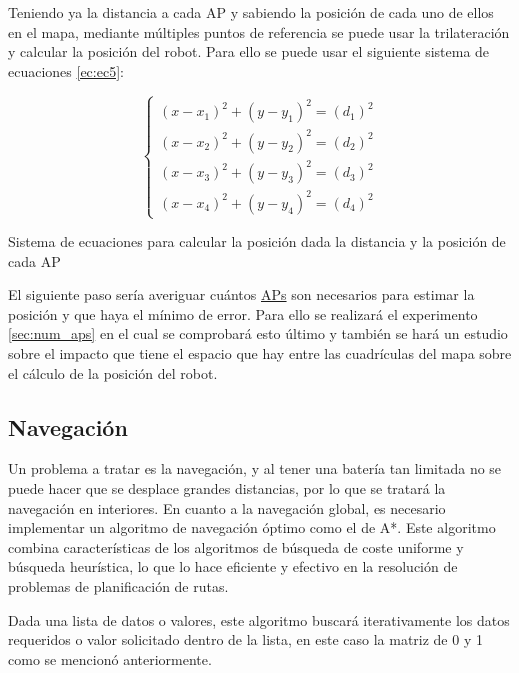 Teniendo ya la distancia a cada AP y sabiendo la posición de cada uno de ellos en el mapa, mediante múltiples puntos de referencia se puede usar la trilateración y calcular la posición del robot. Para ello se puede usar el siguiente sistema de ecuaciones \ref{ec:ec5}:




\begin{myequation}[H]
\begin{equation}
\left\{
	\begin{array}{lcc}
		(x - x_1)^2 + (y - y_1)^2 = (d_1)^2\\
		(x - x_2)^2 + (y - y_2)^2 = (d_2)^2\\
		(x - x_3)^2 + (y - y_3)^2 = (d_3)^2 \\
		(x - x_4)^2 + (y - y_4)^2 = (d_4)^2
	\end{array}
\right.
\label{ec:ec5}
\end{equation}
\caption[Sistema de ecuaciones para calcular la posición dada la distancia y la posición de cada AP]{Sistema de ecuaciones para calcular la posición dada la distancia y la posición de cada AP}
\end{myequation}


El siguiente paso sería averiguar cuántos \hyperlink{APs}{APs} son necesarios para estimar la posición y que haya el mínimo de error. Para ello se realizará el experimento \ref{sec:num_aps} en el cual se comprobará esto último y también se hará un estudio sobre el impacto que tiene el espacio que hay entre las cuadrículas del mapa sobre el cálculo de la posición del robot.


\subsection{Navegación}
\label{subsec:navegación}

Un problema a tratar es la navegación, y al tener una batería tan limitada no se puede hacer que se desplace grandes distancias, por lo que se tratará la navegación en interiores. En cuanto a la navegación global, es necesario implementar un algoritmo de navegación óptimo como el de A*. Este algoritmo combina características de los algoritmos de búsqueda de coste uniforme y búsqueda heurística, lo que lo hace eficiente y efectivo en la resolución de problemas de planificación de rutas. 

Dada una lista de datos o valores, este algoritmo buscará iterativamente los datos requeridos o
valor solicitado dentro de la lista, en este caso la matriz de 0 y 1 como se mencionó anteriormente. 

